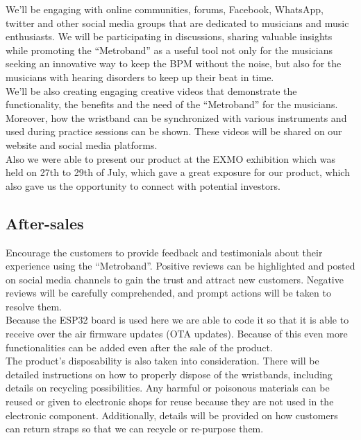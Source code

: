\documentclass{article}
\begin{document}
        We’ll be engaging with online communities, forums, Facebook, WhatsApp, twitter and other social media groups that are dedicated to musicians and music enthusiasts. We will be participating in discussions, sharing valuable insights while promoting the “Metroband” as a useful tool not only for the musicians seeking an innovative way to keep the BPM without the noise, but also for the musicians with hearing disorders to keep up their beat in time.\\
        
        We’ll be also creating engaging creative videos that demonstrate the functionality, the benefits and the need of the “Metroband” for the musicians. Moreover, how the wristband can be synchronized with various instruments and used during practice sessions can be shown. These videos will be shared on our website and social media platforms.\\
        
        Also we were able to present our product at the EXMO exhibition which was held on 27th to 29th of July, which gave a great exposure for our product, which also gave us the opportunity to connect with potential investors.

        \subsection{After-sales}
        Encourage the customers to provide feedback and testimonials about their experience using the “Metroband”. Positive reviews can be highlighted and posted on social media channels to gain the trust and attract new customers. Negative reviews will be carefully comprehended, and prompt actions will be taken to resolve them.\\
        
        Because the ESP32 board is used here we are able to code it so that it is able to receive over the air firmware updates (OTA updates). Because of this even more functionalities can be added even after the sale of the product.\\
        
        The product's disposability is also taken into consideration. There will be detailed instructions on how to properly dispose of the wristbands, including details on recycling possibilities. Any harmful or poisonous materials can be reused or given to electronic shops for reuse because they are not used in the electronic component. Additionally, details will be provided on how customers can return straps so that we can recycle or re-purpose them.\\
\end{document}
